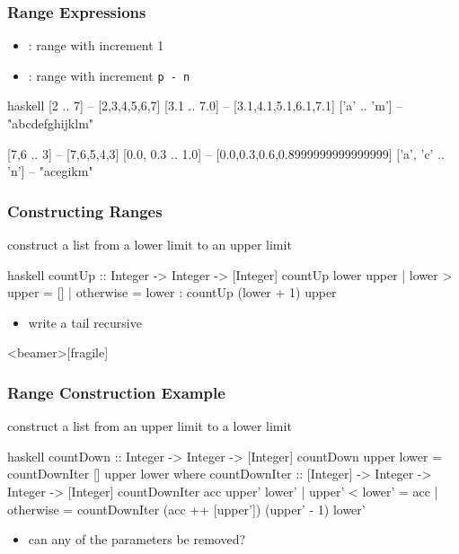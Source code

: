 \documentclass[dvipsnames]{beamer}
\theoremstyle{plain}
\begin{document}
\begin{frame}[fragile]
  \frametitle{Range Expressions}

  \begin{itemize}
    \item {}: range with increment 1
    \item {}: range with increment \texttt{p - n}
  \end{itemize}

  \begin{exampleblock}{}
    \begin{pygments}{haskell}
[2 .. 7]           -- [2,3,4,5,6,7]
[3.1 .. 7.0]       -- [3.1,4.1,5.1,6.1,7.1]
['a' .. 'm']       -- "abcdefghijklm"

[7,6 .. 3]         -- [7,6,5,4,3]
[0.0, 0.3 .. 1.0]  -- [0.0,0.3,0.6,0.8999999999999999]
['a', 'c' .. 'n']  -- "acegikm"
    \end{pygments}
  \end{exampleblock}
\end{frame}

\begin{frame}[fragile]
  \frametitle{Constructing Ranges}

  \begin{exampleblock}{construct a list from a lower limit to an upper limit}
    \begin{pygments}{haskell}
countUp :: Integer -> Integer -> [Integer]
countUp lower upper
  | lower > upper = []
  | otherwise     = lower : countUp (lower + 1) upper
    \end{pygments}
  \end{exampleblock}

  \pause
  \begin{itemize}
    \item write a tail recursive 
  \end{itemize}
\end{frame}

\begin{frame}<beamer>[fragile]
  \frametitle{Range Construction Example}

  \begin{footnotesize}
  \begin{exampleblock}{construct a list from an upper limit to a lower limit}
    \begin{pygments}{haskell}
countDown :: Integer -> Integer -> [Integer]
countDown upper lower = countDownIter [] upper lower
  where
    countDownIter :: [Integer] -> Integer -> Integer -> [Integer]
    countDownIter acc upper' lower'
      | upper' < lower' = acc
      | otherwise       = countDownIter (acc ++ [upper'])
                                        (upper' - 1) lower'
    \end{pygments}
  \end{exampleblock}
  \end{footnotesize}

  \pause
  \begin{itemize}
    \item can any of the parameters be removed?
  \end{itemize}
\end{frame}
\end{document}
